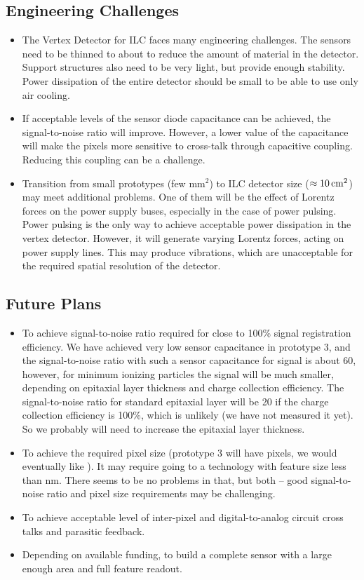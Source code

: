 \subsection{Engineering Challenges}
\begin{itemize}
    \item The Vertex Detector for ILC faces many engineering challenges. The sensors need to be thinned to about \unit[50]{\micron} to reduce the amount of material in the detector. Support structures also need to be very light, but provide enough stability. Power dissipation of the entire detector should be small to be able to use only air cooling.
    \item If acceptable levels of the sensor diode capacitance can be achieved, the signal-to-noise ratio will improve. However, a lower value of the capacitance will make the pixels more sensitive to cross-talk through capacitive coupling. Reducing this coupling can be a challenge.
    \item Transition from small prototypes (few $\text{mm}^{2}$) to ILC detector size ($\approx \unit[10]{cm^2}$) may meet additional problems. One of them will be the effect of Lorentz forces on the power supply buses, especially in the case of power pulsing. Power pulsing is the only way to achieve acceptable power dissipation in the vertex detector. However, it will generate varying Lorentz forces, acting on power supply lines. This may produce vibrations, which are unacceptable for the required spatial resolution of the detector.
\end{itemize}

\subsection{Future Plans}
\begin{itemize}
    \item To achieve signal-to-noise ratio required for close to 100\% signal registration efficiency. We have achieved very low sensor capacitance in prototype 3, and the signal-to-noise ratio with such a sensor capacitance for  signal is about 60, however, for minimum ionizing particles the signal will be much smaller, depending on epitaxial layer thickness and charge collection efficiency. The signal-to-noise ratio for standard \unit[7]{\micron} epitaxial layer will be 20 if the charge collection efficiency is 100\%, which is unlikely (we have not measured it yet). So we probably will need to increase the epitaxial layer thickness.
    \item To achieve the required pixel size (prototype 3 will have \unit[25]{\micron} pixels, we would eventually like \unit[15]{\micron}). It may require going to a technology with feature size less than \unit[65]{nm}. There seems to be no problems in that, but both -- good signal-to-noise ratio and pixel size requirements may be challenging.
    \item To achieve acceptable level of inter-pixel and digital-to-analog circuit cross talks and parasitic feedback.
    \item Depending on available funding, to build a complete sensor with a large enough area and full feature readout.
\end{itemize}

